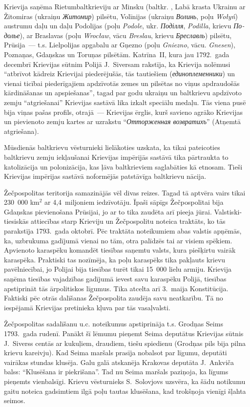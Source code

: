 \documentclass[twoside,a5paper,12pt,fleqn,openany]{extbook}
\newcommand{\pltxti}[1]{\textit{\textpolish{#1}}}
\newcommand{\rutxti}[1]{\textit{\textrussian{#1}}}
\newcommand{\detxti}[1]{\textit{\textgerman{#1}}}
\newcommand{\betxti}[1]{\textit{\textbelarusian{#1}}}
\newcommand{\uktxti}[1]{\textit{\textukrainian{#1}}}
\begin{document}
Krievija saņēma Rietumbaltkrieviju ar Minsku (baltkr. \betxti{Мінск)}, Labā krasta Ukrainu ar Žitomiras (ukraiņu \uktxti{Житомир}) pilsētu, Volīnijas (ukraiņu \uktxti{Волинь}, poļu \pltxti{Wołyń}) austrumu daļu un daļu Podolijas (poļu \pltxti{Podole}, ukr. \uktxti{Поділля}, \uktxti{Podilla}, krievu \rutxti{Подолье}), ar Braslavas (poļu \pltxti{Wrocław}, vācu \detxti{Breslau}, krievu \rutxti{Бреславль}) pilsētu, Prūsija~--- t.s. Lielpolijas apgabalu ar Gņezno (poļu \pltxti{Gniezno}, vācu. \detxti{Gnesen}), Poznaņas, Gdaņskas un Toruņas pilsētām. Katrīna~II, kura jau 1792.~gada decembrī Krievijas sūtnim Polijā J.~Siversam rakstīja, ka Krievija nolēmusi ``atbrīvot kādreiz Krievijai piederējušās, tās tautiešiem (\rutxti{единоплеменники}) un vienai ticībai piederīgajiem apdzīvotās zemes un pilsētas no viņus apdraudošās kārdināšanas un apspiešanas'', tagad par godu ukraiņu un baltkrievu apdzīvoto zemju ``atgriešanai'' Krievijas sastāvā lika izkalt speciālu medaļu. Tās viena pusē bija viņas pašas profils, otrajā~--- Krievijas ērglis, kurš savieno agrāko Krievijas un pievienoto zemju kartes ar uzrakstu ``\rutxti{Отторженная возвратихъ}'' (Atņemtā atgriešana).

Mūsdienās baltkrievu vēsturnieki lielākoties uzskata, ka tikai pateicoties baltkrievu zemju iekļaušanai Krievijas impērijās sastāvā tika pārtraukta to katolizācija un polonizācija, kas ļāva baltkrieviem saglabāties kā etnosam. Tieši Krievijas impērijas sastāvā noformējās patstāvīga baltkrievu nācija.

Žečpospolitas teritorija samazinājās vēl divas reizes. Tagad tā aptvēra vairs tikai 230~000 km$^{2}$ ar 4,4~miljoniem iedzīvotāju. Īpaši sāpīgs Žečpospolitai bija Gdaņskas pievienošana Prūsijai, jo ar to tika zaudēta arī pieeja jūrai. Valstiski-tiesiskās attiecības starp Krieviju un Žečpospolitu noteica traktāts, ko tās parakstīja 1793.~gada oktobrī. Pēc traktāta noteikumiem abas valstis apņēmās, ka, uzbrukuma gadījumā vienai no tām, otra palīdzēs tai ar visiem spēkiem. Apvienoto karaspēku komandēt tiesības saņemtu valsts, kura piešķirtu vairāk karaspēka. Praktiski tas nozīmēja, ka poļu karaspēks tika pakļauts krievu pavēlniecībai, jo Polijai bija tiesības turēt tikai 15~000 lielu armiju. Krievija saņēma tiesības vajadzības gadījumā ievest savu karaspēku Polijā, tiesības apstiprināt tās ārpolitiskos līgumus. Tika atcelta arī 3.~maija Konstitūcija. Faktiski pēc otrās dalīšanas Žečpospolita zaudēja savu neatkarību. Tā no iespējamā Krievijas pretinieka kļuva par tās vasaļvalsti.

Žečpospolitas sadalīšanu u.c. noteikumus apstiprināja t.s. Grodņas Seims 1793.~gada rudenī. Panākt šī lēmumu pieņemt Seima deputātus Krievijas sūtnis J.~Siverss centās ar kukuļiem, draudiem, tiešu spiedienu (Grodņas pils bija pilna krievu kareivju). Kad Seima maršals prasīja nobalsot par līgumu, deputāti vairākas stundas klusēja. Galu galā atskanēja Krakovas deputāta J.~Ankviča balss: ``Klusēšana ir piekrišana''. Tad nu Seima maršals paziņoja, ka līgums pieņemts vienbalsīgi. Krievu vēsturnieks S.~Solovjovs uzsvēra, ka šādu notikumu gaitu noteica gadsimtiem ilgā poļu tautas klusēšana, kad trokšņoja vienīgi šļahta seimos.
\end{document}
